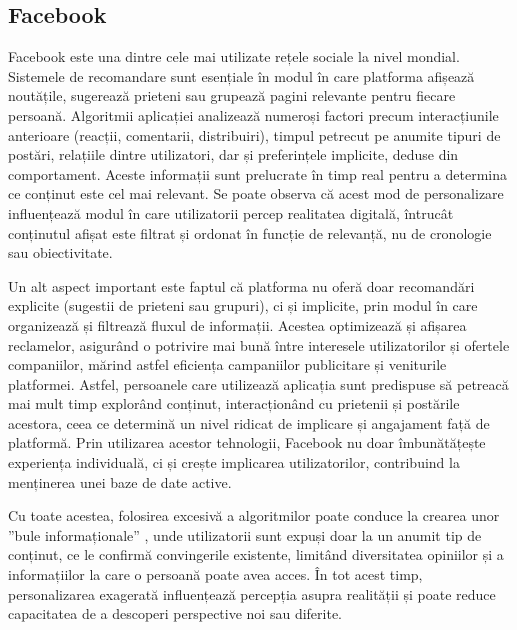 \subsection*{Facebook}
Facebook este una dintre cele mai utilizate rețele sociale la nivel mondial.
Sistemele de recomandare sunt esențiale în modul în care platforma afișează noutățile, sugerează prieteni sau grupează pagini relevante pentru fiecare persoană.
Algoritmii aplicației analizează numeroși factori precum interacțiunile anterioare (reacții, comentarii, distribuiri), timpul petrecut pe anumite tipuri de postări, relațiile dintre utilizatori, dar și preferințele implicite, deduse din comportament.
Aceste informații sunt prelucrate în timp real pentru a determina ce conținut este cel mai relevant. 
Se poate observa că acest mod de personalizare influențează modul în care utilizatorii percep realitatea digitală, întrucât conținutul afișat este filtrat și ordonat în funcție de relevanță, nu de cronologie sau obiectivitate\cite{baatarjav2008group}.
\par
Un alt aspect important este faptul că platforma nu oferă doar recomandări explicite (sugestii de prieteni sau grupuri), ci și implicite, prin modul în care organizează și filtrează fluxul de informații. 
Acestea optimizează și afișarea reclamelor, asigurând o potrivire mai bună între interesele utilizatorilor și ofertele companiilor, mărind astfel eficiența campaniilor publicitare și veniturile platformei.
Astfel, persoanele care utilizează aplicația sunt predispuse să petreacă mai mult timp explorând conținut, interacționând cu prietenii și postările acestora, ceea ce determină un nivel ridicat de implicare și angajament față de platformă.
Prin utilizarea acestor tehnologii, Facebook nu doar îmbunătățește experiența individuală, ci și crește implicarea utilizatorilor, contribuind la menținerea unei baze de date active\cite{heimbach2015value}.
\par
Cu toate acestea, folosirea excesivă a algoritmilor poate conduce la crearea unor ”bule informaționale” \cite{nguyen2014exploring}, unde utilizatorii sunt expuși doar la un anumit tip de conținut, ce le confirmă convingerile existente, limitând diversitatea opiniilor și a informațiilor la care o persoană poate avea acces.
În tot acest timp, personalizarea exagerată influențează percepția asupra realității și poate reduce capacitatea de a descoperi perspective noi sau diferite.

